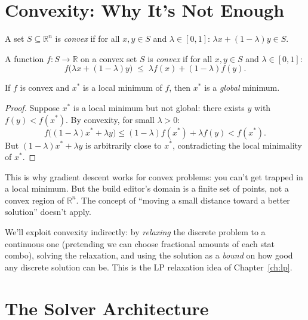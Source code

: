 \documentclass[11pt, a4paper, oneside]{book}
\newcommand{\R}{\mathbb{R}}
\begin{document}
\section{Convexity: Why It's Not Enough}

\begin{defbox}[title={Convex Set}]
A set $S \subseteq \R^n$ is \emph{convex} if for all $x, y \in S$ and
$\lambda \in [0, 1]$: $\lambda x + (1-\lambda)y \in S$.
\end{defbox}

\begin{defbox}[title={Convex Function}]
A function $f : S \to \R$ on a convex set $S$ is \emph{convex} if for all
$x, y \in S$ and $\lambda \in [0, 1]$:
\[
  f\!\big(\lambda x + (1-\lambda)y\big) \;\leq\; \lambda f(x) + (1-\lambda) f(y).
\]
\end{defbox}

\begin{thmbox}[title={Convex $\Rightarrow$ Local = Global}]
If $f$ is convex and $x^*$ is a local minimum of $f$, then $x^*$ is a
\emph{global} minimum.
\end{thmbox}

\begin{proof}
Suppose $x^*$ is a local minimum but not global: there exists $y$ with
$f(y) < f(x^*)$.  By convexity, for small $\lambda > 0$:
\[
  f\!\big((1-\lambda)x^* + \lambda y\big)
  \leq (1-\lambda) f(x^*) + \lambda f(y)
  < f(x^*).
\]
But $(1-\lambda)x^* + \lambda y$ is arbitrarily close to $x^*$, contradicting
the local minimality of $x^*$.
\end{proof}

This is why gradient descent works for convex problems: you can't get trapped
in a local minimum.  But the build editor's domain is a finite set of points,
not a convex region of $\R^n$.  The concept of ``moving a small distance
toward a better solution'' doesn't apply.

\begin{intuitionbox}
We'll exploit convexity indirectly: by \emph{relaxing} the discrete problem
to a continuous one (pretending we can choose fractional amounts of each
stat combo), solving the relaxation, and using the solution as a \emph{bound}
on how good any discrete solution can be.  This is the LP relaxation idea
of Chapter~\ref{ch:lp}.
\end{intuitionbox}

\section{The Solver Architecture}
\end{document}
